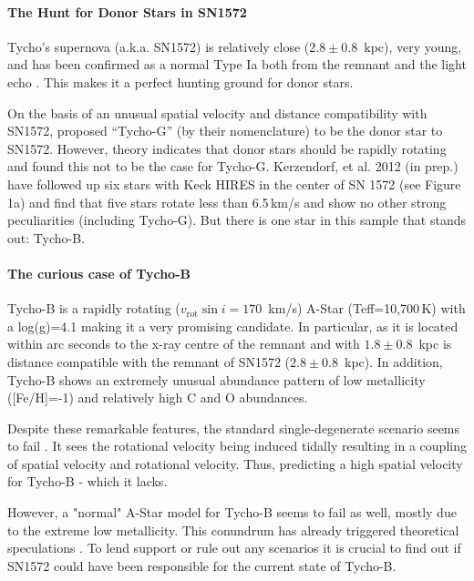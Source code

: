 \documentclass[12pt]{article}
\begin{document}
\vspace{-5mm}
\paragraph{The Hunt for Donor Stars in SN1572}
Tycho's supernova (a.k.a. SN1572) is relatively close ($2.8\pm0.8$~kpc), very young, and has been confirmed as a normal Type Ia both from the remnant \citep{2006ApJ...645.1373B} and the light echo \citep{2008ApJ...681L..81R,2008Natur.456..617K}. This makes it a perfect hunting ground for donor stars.

On the basis of an unusual spatial velocity and distance compatibility with SN1572, \citet{2004Natur.431.1069R} proposed ``Tycho-G'' (by their nomenclature) to be the donor star to SN1572.  However, theory indicates that donor stars should be rapidly rotating and \citet{2009ApJ...701.1665K} found this not to be the case for Tycho-G. Kerzendorf, et al. 2012 (in prep.) have followed up six stars with Keck HIRES in the center of SN 1572 (see Figure 1a) and find that five stars rotate less than 6.5\,km/s and show no other strong peculiarities (including Tycho-G). But there is one star in this sample that stands out: Tycho-B.

\vspace{-5mm}
\paragraph{The curious case of Tycho-B}
Tycho-B is a rapidly rotating ($v_\textrm{rot} \sin{i}=170$~km/s) A-Star (Teff=10,700\,K) with a log(g)=4.1 making it a very promising candidate. In particular, as it is located within arc seconds to the x-ray centre of the remnant and with $1.8\pm 0.8$~kpc is distance compatible with the remnant of SN1572 ($2.8\pm0.8$~kpc). In addition, Tycho-B shows an extremely unusual abundance pattern of low metallicity ([Fe/H]=-1) and relatively high C and O abundances.

Despite these remarkable features, the standard single-degenerate scenario seems to fail \citep{2012arXiv1210.2713K}.  It sees the rotational velocity being induced tidally resulting in a coupling of spatial velocity and rotational velocity. Thus, predicting a high spatial velocity for Tycho-B - which it lacks. 

However, a "normal" A-Star model for Tycho-B seems to fail as well, mostly due to the extreme low metallicity. This conundrum has already triggered theoretical speculations \citep[e.g.][]{2012arXiv1212.2662T}. To lend support or rule out any scenarios it is crucial to find out if SN1572 could have been responsible for the current state of Tycho-B.
\end{document}
